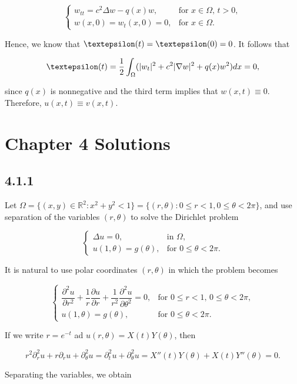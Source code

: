 \documentclass{article}
\begin{document}
\[
  \begin{cases}
  w_{tt}=c^2\Delta w - q(x)w, &\text{for $x\in\Omega$, $t>0$}, \\
  w(x,0)=w_t(x,0)=0, &\text{for $x\in\Omega$} .
  \end{cases}
\]

Hence, we know that $\textepsilon(t)=\textepsilon(0)=0$. It follows that

$$\textepsilon(t)=\frac{1}{2}\int_{\Omega}(|w_t|^2+c^2|\nabla w|^2+q(x)w^2) dx=0,$$

since $q(x)$ is nonnegative and the third term implies that $w(x,t)\equiv 0$. Therefore, $u(x,t)\equiv v(x,t)$.

\section{Chapter 4 Solutions}

\subsection{\textbf{4.1.1}} Let $\Omega=\{(x,y)\in\mathbb R^2 : x^2+y^2<1\}=\{(r,\theta):0\leq r <1, 0 \leq \theta < 2\pi\}$, and use separation of the variables $(r,\theta)$ to solve the Dirichlet problem

\[
  \begin{cases}
  \Delta u = 0, & \text{in $\Omega$}, \\
  u(1,\theta) =g(\theta), & \text{for $0\leq \theta < 2\pi$}.
  \end{cases}
\]

It is natural to use polar coordinates $(r,\theta)$ in which the problem becomes

\[
  \begin{cases}
  \dfrac{\partial^2 u}{\partial r^2} + \dfrac{1}{r}\dfrac{\partial u}{\partial r} + \dfrac{1}{r^2}\dfrac{\partial^2 u}{\partial \theta^2}=0, & \text{for $0\leq r < 1$, $0\leq \theta < 2\pi$}, \\
  u(1,\theta) =g(\theta), & \text{for $0\leq \theta < 2\pi$}.
  \end{cases}
\]

If we write $r=e^{-t}$ ad $u(r,\theta)=X(t)Y(\theta)$, then

$$r^2\partial_r^2 u + r\partial_r u + \partial_{\theta}^2 u = \partial_t^2 u + \partial_{\theta}^2 u = X''(t)Y(\theta)+X(t)Y''(\theta)=0.$$

Separating the variables, we obtain
\end{document}
